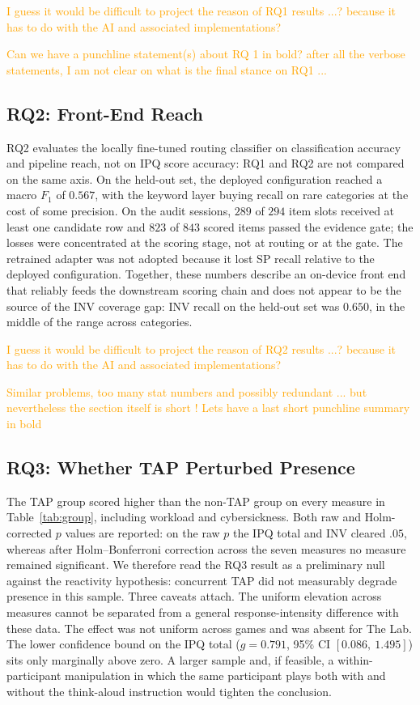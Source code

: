 \textcolor{orange}{
I guess it would be difficult to project the reason of RQ1 results ...?  because it has to do with the AI and associated implementations?
}

\textcolor{orange}{
Can we have a punchline statement(s) about RQ 1 in bold?  after all the verbose statements, I am not clear on what is the final stance on RQ1 ...}

\subsection{RQ2: Front-End Reach}

RQ2 evaluates the locally fine-tuned routing classifier on classification accuracy and pipeline reach, not on IPQ score accuracy: RQ1 and RQ2 are not compared on the same axis. On the held-out set, the deployed configuration reached a macro $F_1$ of $0.567$, with the keyword layer buying recall on rare categories at the cost of some precision. On the audit sessions, $289$ of $294$ item slots received at least one candidate row and $823$ of $843$ scored items passed the evidence gate; the losses were concentrated at the scoring stage, not at routing or at the gate. The retrained adapter was not adopted because it lost SP recall relative to the deployed configuration. Together, these numbers describe an on-device front end that reliably feeds the downstream scoring chain and does not appear to be the source of the INV coverage gap: INV recall on the held-out set was $0.650$, in the middle of the range across categories.

\textcolor{orange}{
I guess it would be difficult to project the reason of RQ2 results ...?  because it has to do with the AI and associated implementations?
}

\textcolor{orange}{Similar problems, too many stat numbers and possibly redundant ... but nevertheless the section itself is short ! Lets have a last short punchline summary in bold}


\subsection{RQ3: Whether TAP Perturbed Presence}

The TAP group scored higher than the non-TAP group on every measure in Table~\ref{tab:group}, including workload and cybersickness. Both raw and Holm-corrected $p$ values are reported: on the raw $p$ the IPQ total and INV cleared $.05$, whereas after Holm--Bonferroni correction across the seven measures no measure remained significant. We therefore read the RQ3 result as a preliminary null against the reactivity hypothesis: concurrent TAP did not measurably degrade presence in this sample. Three caveats attach. The uniform elevation across measures cannot be separated from a general response-intensity difference with these data. The effect was not uniform across games and was absent for The Lab. The lower confidence bound on the IPQ total ($g=0.791$, 95\% CI $[0.086,\ 1.495]$) sits only marginally above zero. A larger sample and, if feasible, a within-participant manipulation in which the same participant plays both with and without the think-aloud instruction would tighten the conclusion.

